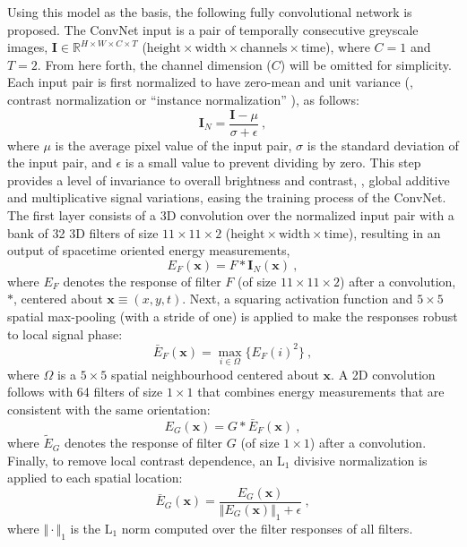 Using this model as the basis, the following fully convolutional 
network \cite{shelhamer2017}  is proposed.
The ConvNet input is a pair of temporally consecutive greyscale images, $\mathbf{I} \in \mathbb{R}^{H \times W \times C \times T}$ ($\text{height} \times \text{width} \times \text{channels} \times \text{time}$), where $C=1$ and $T=2$. From here forth, the channel dimension ($C$) will be omitted for simplicity.
Each input pair is first normalized to have zero-mean and unit
variance (\ie, contrast normalization or ``instance normalization'' \cite{ulyanov2017}), as follows:
\begin{equation}
	\mathbf{I}_N = \frac{\mathbf{I} - \mu}{\sigma + \epsilon}\ ,
\end{equation}
where $\mu$ is the average pixel value of the input pair, $\sigma$ is the standard deviation of the input pair, and $\epsilon$ is a small value to prevent dividing by zero.
This step provides a level of invariance  to overall brightness and contrast, \ie, global additive and
multiplicative signal variations, easing the training process of the ConvNet. 
The first layer consists of a 3D convolution over the normalized input pair with a bank of 32 3D filters of size $11\times 11 \times 2$
($\text{height} \times \text{width} \times \text{time}$), resulting in an output of spacetime oriented energy measurements, 
\begin{equation}
	E_F(\mathbf{x}) = F * \mathbf{I}_N(\mathbf{x})\ ,
\end{equation}
where $E_F$ denotes the response of filter $F$ (of size $11\times 11 \times 2$) after a convolution, $*$, centered about $\mathbf{x} \equiv (x, y, t)$.
Next, a squaring activation function and $5 \times 5$
spatial max-pooling (with a stride of one) is applied to
make the responses robust to local signal phase:
\begin{equation}
	\bar{E}_F(\mathbf{x}) = \max_{i\in\Omega}\{E_F(i)^2\}\ ,
\end{equation}
where $\Omega$ is a $5 \times 5$ spatial neighbourhood centered about $\mathbf{x}$.
A 2D convolution follows with 64 filters of size $1 \times 1$ that combines
energy measurements that are consistent
with the same orientation:
\begin{equation}
	E_G(\mathbf{x}) = G * \bar{E}_F(\mathbf{x})\ ,
\end{equation}
where  $\tilde{E}_G$ denotes the response of filter $G$ (of size $1 \times 1$) after a convolution.
Finally, to remove local contrast dependence, an
$\text{L}_1$ divisive normalization is applied to each spatial location: 
\begin{equation}
	\bar{E}_G(\mathbf{x}) = \frac{E_G(\mathbf{x})}{\Vert E_G(\mathbf{x}) \Vert_1 + \epsilon}\ ,
\end{equation}
where $\Vert \cdot \Vert_1$ is the $\text{L}_1$ norm computed over the filter responses of all filters.

